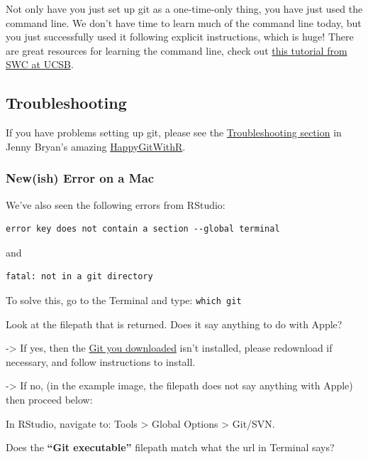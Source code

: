 \documentclass[]{book}
\begin{document}
Not only have you just set up git as a one-time-only thing, you have just used the command line. We don't have time to learn much of the command line today, but you just successfully used it following explicit instructions, which is huge! There are great resources for learning the command line, check out \href{http://remi-daigle.github.io/2016-04-15-UCSB/shell/}{this tutorial from SWC at UCSB}.

\hypertarget{troubleshooting}{%
\subsection{Troubleshooting}\label{troubleshooting}}

If you have problems setting up git, please see the \href{http://happygitwithr.com/troubleshooting.html}{Troubleshooting section} in Jenny Bryan's amazing \href{http://happygitwithr.com}{HappyGitWithR}.

\hypertarget{newish-error-on-a-mac}{%
\subsubsection{New(ish) Error on a Mac}\label{newish-error-on-a-mac}}

We've also seen the following errors from RStudio:

\begin{verbatim}
error key does not contain a section --global terminal
\end{verbatim}

and

\begin{verbatim}
fatal: not in a git directory
\end{verbatim}

To solve this, go to the Terminal and type:
\texttt{which\ git}

Look at the filepath that is returned. Does it say anything to do with Apple?

-\textgreater{} If yes, then the \href{https://git-scm.com/downloads}{Git you downloaded} isn't installed, please redownload if necessary, and follow instructions to install.

-\textgreater{} If no, (in the example image, the filepath does not say anything with Apple) then proceed below:

In RStudio, navigate to: Tools \textgreater{} Global Options \textgreater{} Git/SVN.

Does the \textbf{``Git executable''} filepath match what the url in Terminal says?
\end{document}
